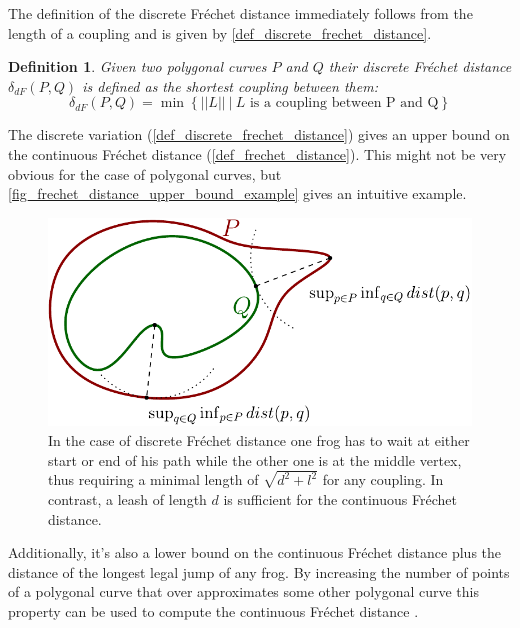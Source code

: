\documentclass[
oneside,
fontsize=11pt
]{scrartcl}
\newtheorem{mydef}{Definition}
\begin{document}
The definition of the discrete Fréchet distance immediately follows from 
the length of a coupling and is given by \autoref{def_discrete_frechet_distance}.

\begin{mydef}
  \label{def_discrete_frechet_distance}
  Given two polygonal curves $P$ and $Q$
  their discrete Fréchet distance $\delta_{dF}(P,Q)$ is defined as the shortest coupling between them: 
  $$\delta_{dF}(P,Q) = \min \left\{ ||L|| \ | \  L \text{ is a coupling between P and Q} \right\}$$
\end{mydef}

The discrete variation (\autoref{def_discrete_frechet_distance}) gives an upper bound on the continuous Fréchet distance (\autoref{def_frechet_distance}). 
This might not be very obvious for the case of polygonal curves, 
but \autoref{fig_frechet_distance_upper_bound_example} gives an intuitive example.

\begin{figure}[ht]
  \centering
  \includegraphics[width=\textwidth]{images/hausdorff/hausdorff-distance-example.pdf}
  \caption[Upper bound on Fréchet distance]{
    In the case of discrete Fréchet distance 
    one frog has to wait at either start or end of his path 
    while the other one is at the middle vertex, 
    thus requiring a minimal length of $\sqrt{d^2 + l^2}$ for any coupling.
    In contrast, a leash of length $d$ is sufficient for the continuous Fréchet distance.}
  \label{fig_frechet_distance_upper_bound_example}
\end{figure}




Additionally, it's also a lower bound on the continuous Fréchet distance 
plus the distance of the longest legal jump of any frog. 
By increasing the number of points of a polygonal curve that 
over approximates some other polygonal curve
this property can be used to compute the continuous Fréchet distance \cite{eiter_computing_1994}.
\end{document}
